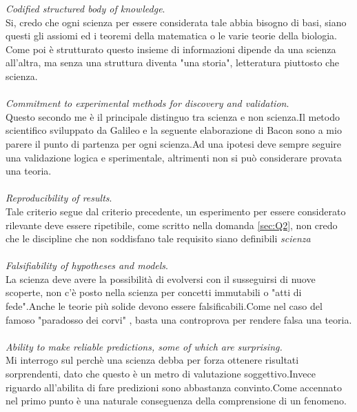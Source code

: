 \documentclass[a4paper]{article}
\begin{document}
\emph{Codified structured body of knowledge}.\\
Si, credo che ogni scienza per essere considerata tale abbia bisogno di basi, siano questi gli assiomi ed i teoremi della matematica o le varie teorie della biologia.
Come poi è strutturato questo insieme di informazioni dipende da una scienza all'altra, ma senza una struttura diventa "una storia", letteratura piuttosto che scienza.
\\\\

\emph{Commitment to experimental methods for discovery and validation}.\\
Questo secondo me è il principale distinguo tra scienza e non scienza.Il metodo scientifico sviluppato da Galileo e la seguente elaborazione di Bacon sono a mio parere il punto di partenza per ogni scienza.Ad una ipotesi deve sempre seguire una validazione logica e sperimentale, altrimenti non si può considerare provata una teoria.
\\\\

\emph{Reproducibility of results}.\\
Tale criterio segue dal criterio precedente, un esperimento per essere considerato rilevante deve essere ripetibile, come scritto nella domanda \ref{sec:Q2}, non credo che le discipline che non soddisfano tale requisito siano definibili \emph{scienza}
\\\\

\emph{Falsifiability of hypotheses and models}.\\
La scienza deve avere la possibilità di evolversi con il susseguirsi di nuove scoperte, non c'è posto nella scienza per concetti immutabili o "atti di fede".Anche le teorie più solide devono essere falsificabili.Come nel caso del famoso "paradosso dei corvi" \cite{corvi}, basta una controprova per rendere falsa una teoria.
\\\\

\emph{Ability to make reliable predictions, some of which are surprising.}\\ Mi interrogo sul perchè una scienza debba per forza ottenere risultati sorprendenti, dato che questo è un metro di valutazione soggettivo.Invece riguardo all'abilita di fare predizioni sono abbastanza convinto.Come accennato nel primo punto è una naturale conseguenza della comprensione di un fenomeno. 
\end{document}
